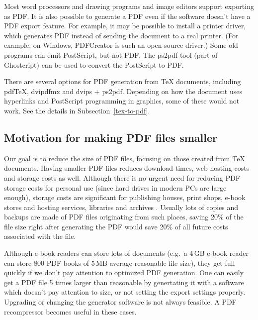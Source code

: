 \documentclass{ltugproc}
\def\cmd{\textsf}
\begin{document}
Most word processors and drawing programs and image editors support
exporting as PDF. It is also possible to generate a PDF even if the software
doesn't have a PDF export feature. For example, it may be possible to
install a printer driver, which generates PDF instead of sending the
document to a real printer. (For example, on Windows, PDFCreator
\cite{pdfcreator} is such an open-source driver.) Some old programs can emit
PostScript, but not PDF. The \cmd{ps2pdf} \cite{ps2df} tool (part of
Ghostcript) can be used to convert the PostScript to PDF.

There are several options for PDF generation from
\TeX{} documents, including
pdf\TeX{}, \cmd{dvipdfmx} and \cmd{dvips} $+$ \cmd{ps2pdf}. Depending on how
the document uses hyperlinks and PostScript programming in graphics, some of
these would not work. See the details in Subsection~\ref{tex-to-pdf}.

\subsection{Motivation for making PDF files smaller}

Our goal is to reduce the size of PDF files, focusing on those
created from \TeX{} documents. Having smaller PDF files reduces download
times, web hosting costs and storage costs as well. Although there is no
urgent need for reducing PDF storage costs for personal use (since hard
drives in modern PCs are large enough), storage costs are significant for
publishing houses, print shops, e-book stores and hosting services,
libraries and archives \cite{multivalent-article}.
Usually lots of copies and backups are made of PDF
files originating from such places, saving 20\% of the file size right after
generating the PDF would save 20\% of all future costs associated with the
file.

Although e-book readers can store lots of documents (e.g.\ a 4\,GB e-book
reader can store 800 PDF books of 5\,MB average reasonable file size), they
get full quickly if we don't pay attention to optimized PDF generation. One
can easily get a PDF file 5 times larger than reasonable by genertating it
with a software which doesn't pay attention to size,
or not setting the export settings
properly. Upgrading or changing the generator software is not always
feasible. A PDF recompressor becomes useful in these cases.
\end{document}
